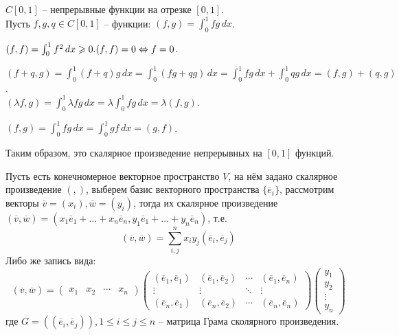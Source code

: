	\begin{Example}
	  $C[0, 1]$ -- непрерывные функции на отрезке $[0, 1]$.\\
	  Пусть $f, g, q \in C[0, 1]$ -- функции: $(f, g) = \int_0^1 fg \,dx$.
	  \begin{MyList}
		\item $(f, f) = \int_0^1 f^2 \,dx \geqslant 0. \\
		(f, f) = 0  \Leftrightarrow f = 0$.
		\item $(f + q, g) = \int_0^1 (f + q)g \,dx = \int_0^1 (fg + qg) \,dx = \int_0^1 fg \,dx + \int_0^1 qg \,dx = (f, g) + (q, g)$. \\
		$(\lambda f, g) =\int_0^1 \lambda fg \,dx  = \lambda \int_0^1 fg \,dx = \lambda(f, g)$.
		\item $(f, g) =\int_0^1 fg \,dx  = \int_0^1 gf \,dx = (g, f)$.
	  \end{MyList}
	  Таким образом, это скалярное произведение непрерывных на $[0, 1]$ функций.
	\end{Example}
  
	Пусть есть конечномерное векторное пространство $V$, на нём задано скалярное произведение $(,)$, выберем базис векторного пространства $\{\overline{e}_i\}$, рассмотрим векторы $\overline{v} = (x_i), \overline{w} = (y_i)$, 
	тогда их скалярное произведение $(\overline{v}, \overline{w}) = (x_1 \overline{e}_1 + ... + x_n \overline{e}_n, y_1 \overline{e}_1 + ... + y_n\overline{e}_n)$, т.е.
	$$(\overline{v}, \overline{w}) = \sum_{i, j}^n x_i y_j (\overline{e}_i, \overline{e}_j)$$
	Либо же запись вида:
	\[(\overline{v}, \overline{w}) = \left(\begin{array}{cccc}
	  x_1 & x_2 & \cdots & x_n
	  \end{array}\right)
	   \left(\begin{array}{cccc}
	  (\overline{e}_1, \overline{e}_1) & (\overline{e}_1, \overline{e}_2) & \cdots & (\overline{e}_1, \overline{e}_n) \\ 
	  \vdots & \vdots & \ddots & \vdots \\
	  (\overline{e}_n, \overline{e}_1) & (\overline{e}_n, \overline{e}_2) & \cdots & (\overline{e}_n, \overline{e}_n)
	  \end{array}\right) 
	  \left(\begin{array}{c}
		  y_1 \\ 
		  y_2 \\ 
		  \vdots \\ 
		  y_n
		  \end{array}\right)\] 
	  где $G = ((\overline{e}_i, \overline{e}_j)), {1 \leqslant i \leqslant j \leqslant n}$ -- матрица Грама сколярного произведения.
	  
